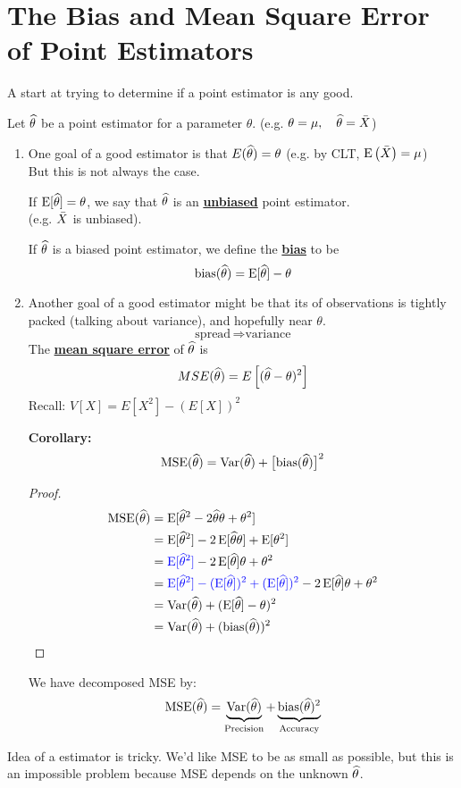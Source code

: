 \section{The Bias and Mean Square Error of Point Estimators}
A start at trying to determine if a point estimator is any good.

\nl Let $\widehat{\theta}$ be a point estimator for a parameter $\theta$. (e.g. $\theta = \mu, \quad \widehat{\theta} = \bar{X}$)
\begin{enumerate}[label=\textcircled{\raisebox{-1pt}{\arabic*}}]
    \item 
        One goal of a good estimator is that $E(\widehat{\theta}) = \theta$ (e.g. by CLT, $\E{\Xbar} = \mu$)\\But this is not always the case.
        
         If $\Eb*{\that}=\theta$, we say that $\widehat{\theta}$ is an \textbf{\underline{unbiased}} point estimator.\\(e.g. $\bar{X}$ is unbiased).

        \nl If $\widehat{\theta}$ is a biased point estimator, we define the \underline{\textbf{bias}} to be
        $$\bias*{\that} = \Eb*{\that} - \theta$$
    
    \item 
        Another goal of a good estimator might be that its  of observations is tightly packed (talking about variance), and hopefully near $\theta$.
        $$\text{spread}\, \Longrightarrow \text{variance}$$
         The \textbf{\underline{mean square error}} of $\widehat{\theta}$ is
        $$MSE(\that) = E\brac{(\that - \theta)^2}$$
        Recall: $V[X] = E[X^2] - (E[X])^2$
        
        \nl \textbf{Corollary:}
        $$\MSE*{\that} = \Var*{\that} + \bigbrac{\bias*{\that}}^2$$
        \begin{proof}
            \begin{align*}
                \MSE*{\that} &= \Eb*{\that^2 - 2\that \theta + \theta ^2}\\
                &= \Eb*{\that^2} - 2\Eb*{\that\theta} + \Eb*{\theta ^2} \\
                &= \blue{\Eb*{\that^2}} - 2\Eb*{\that}\theta + \theta^2 \\
                &= \blue{\Eb*{\that^2} - \pars*{\Eb*{\that}}^2 + \pars*{\Eb*{\that}}^2} - 2\Eb*{\that}\theta + \theta ^2\\
                &= \Var*{\that} + \pars*{\Eb*{\that}-\theta}^2\\
                &= \Var*{\that} + \pars*{\bias*{\that}}^2
            \end{align*}
        \end{proof}
\remark We have decomposed MSE by:
$$\MSE*{\that} = \underbrace{\Var*{\that}}_{\text{Precision}} + \underbrace{\bias*{\that}^2}_{\text{Accuracy}}$$
\end{enumerate}
Idea of a  estimator is tricky. We'd like MSE to be as small as possible, but this is an impossible problem because MSE depends on the unknown $\widehat{\theta}$.

